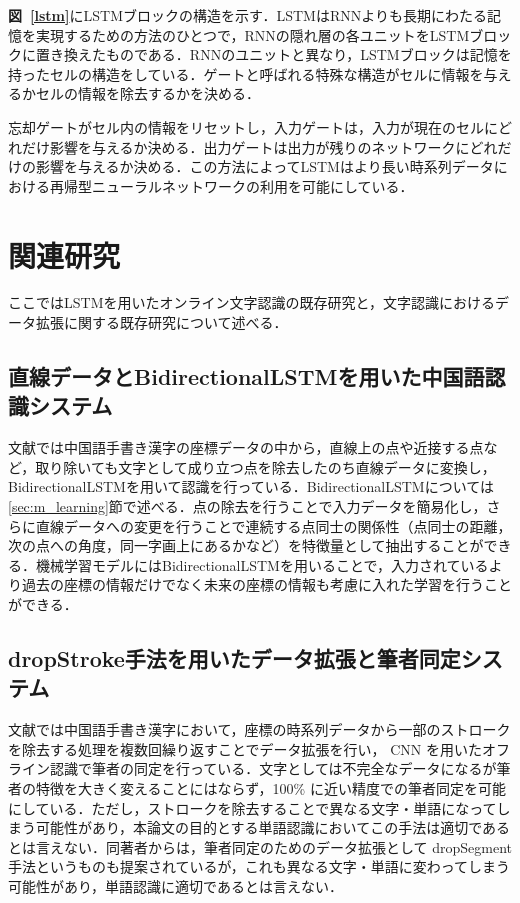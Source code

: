 \textbf{図~\ref{lstm}}にLSTMブロックの構造を示す．LSTMはRNNよりも長期にわたる記憶を実現するための方法のひとつで，RNNの隠れ層の各ユニットをLSTMブロックに置き換えたものである．RNNのユニットと異なり，LSTMブロックは記憶を持ったセルの構造をしている．ゲートと呼ばれる特殊な構造がセルに情報を与えるかセルの情報を除去するかを決める．

忘却ゲートがセル内の情報をリセットし，入力ゲートは，入力が現在のセルにどれだけ影響を与えるか決める．出力ゲートは出力が残りのネットワークにどれだけの影響を与えるか決める．この方法によってLSTMはより長い時系列データにおける再帰型ニューラルネットワークの利用を可能にしている．

\section{関連研究}
\label{sec:rel_3}
ここではLSTMを用いたオンライン文字認識の既存研究と，文字認識におけるデータ拡張に関する既存研究について述べる．

\subsection{直線データとBidirectionalLSTMを用いた中国語認識システム\cite{zhang18:drawing}}
\label{ssec:drawing}
文献\cite{zhang18:drawing}では中国語手書き漢字の座標データの中から，直線上の点や近接する点など，取り除いても文字として成り立つ点を除去したのち直線データに変換し，BidirectionalLSTMを用いて認識を行っている．BidirectionalLSTMについては\ref{sec:m_learning}節で述べる．点の除去を行うことで入力データを簡易化し，さらに直線データへの変更を行うことで連続する点同士の関係性（点同士の距離，次の点への角度，同一字画上にあるかなど）を特徴量として抽出することができる．機械学習モデルにはBidirectionalLSTMを用いることで，入力されているより過去の座標の情報だけでなく未来の座標の情報も考慮に入れた学習を行うことができる．

\subsection{dropStroke手法を用いたデータ拡張と筆者同定システム\cite{yang15:dropstroke}}
文献\cite{yang15:dropstroke}では中国語手書き漢字において，座標の時系列データから一部のストロークを除去する処理を複数回繰り返すことでデータ拡張を行い， CNN を用いたオフライン認識で筆者の同定を行っている．文字としては不完全なデータになるが筆者の特徴を大きく変えることにはならず，100\% に近い精度での筆者同定を可能にしている．ただし，ストロークを除去することで異なる文字・単語になってしまう可能性があり，本論文の目的とする単語認識においてこの手法は適切であるとは言えない．同著者からは，筆者同定のためのデータ拡張として dropSegment 手法というものも提案されているが\cite{yang16:dropsegment}，これも異なる文字・単語に変わってしまう可能性があり，単語認識に適切であるとは言えない．

